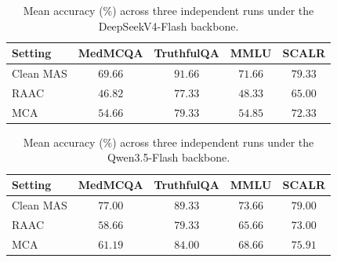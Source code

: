 \providecommand{\DeepSeekModelName}{DeepSeekV4-Flash}
\providecommand{\QwenModelName}{Qwen3.5-Flash}

\begin{table}[H]
  \caption{Mean accuracy (\%) across three independent runs under the
  \DeepSeekModelName{} backbone.}
  \label{tab:appendix-deepseek-clean-raac-mca}
  \centering
  \footnotesize
  \setlength{\tabcolsep}{3pt}
  \begin{tabular}{@{}lcccc@{}}
    \toprule
    Setting & MedMCQA & TruthfulQA & MMLU & SCALR \\
    \midrule
    Clean MAS
      & $\mathbf{69.66}$
      & $\mathbf{91.66}$
      & $\mathbf{71.66}$
      & $\mathbf{79.33}$ \\
    RAAC
      & $46.82$
      & $77.33$
      & $48.33$
      & $65.00$ \\
    MCA
      & $54.66$
      & $79.33$
      & $54.85$
      & $72.33$ \\
    \bottomrule
  \end{tabular}

\end{table}

\begin{table}[H]
  \caption{Mean accuracy (\%) across three independent runs under the
  \QwenModelName{} backbone.}
  \label{tab:appendix-qwen-clean-raac-mca}
  \centering
  \footnotesize
  \setlength{\tabcolsep}{3pt}
  \begin{tabular}{@{}lcccc@{}}
    \toprule
    Setting & MedMCQA & TruthfulQA & MMLU & SCALR \\
    \midrule
    Clean MAS
      & $\mathbf{77.00}$
      & $\mathbf{89.33}$
      & $\mathbf{73.66}$
      & $\mathbf{79.00}$ \\
    RAAC
      & $58.66$
      & $79.33$
      & $65.66$
      & $73.00$ \\
    MCA
      & $61.19$
      & $84.00$
      & $68.66$
      & $75.91$ \\
    \bottomrule
  \end{tabular}

\end{table}

